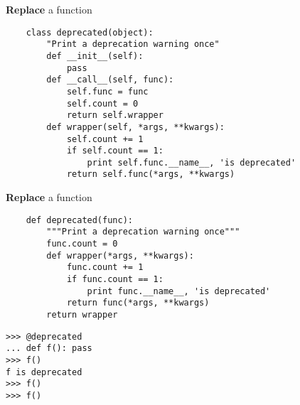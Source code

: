 \documentclass{beamer}
\begin{document}
\begin{frame}[fragile]{\textbf{Replace} a function}
  \begin{verbatim}
    class deprecated(object):
        "Print a deprecation warning once"
        def __init__(self):
            pass
        def __call__(self, func):
            self.func = func
            self.count = 0
            return self.wrapper
        def wrapper(self, *args, **kwargs):
            self.count += 1
            if self.count == 1:
                print self.func.__name__, 'is deprecated'
            return self.func(*args, **kwargs)
  \end{verbatim}
\end{frame}

\begin{frame}[fragile]{\textbf{Replace} a function}
  \begin{verbatim}
    def deprecated(func):
        """Print a deprecation warning once"""
        func.count = 0
        def wrapper(*args, **kwargs):
            func.count += 1
            if func.count == 1:
                print func.__name__, 'is deprecated'
            return func(*args, **kwargs)
        return wrapper
  \end{verbatim}
  \begin{verbatim}
>>> @deprecated
... def f(): pass
>>> f()
f is deprecated
>>> f()
>>> f()
  \end{verbatim}
\end{frame}


\end{document}
